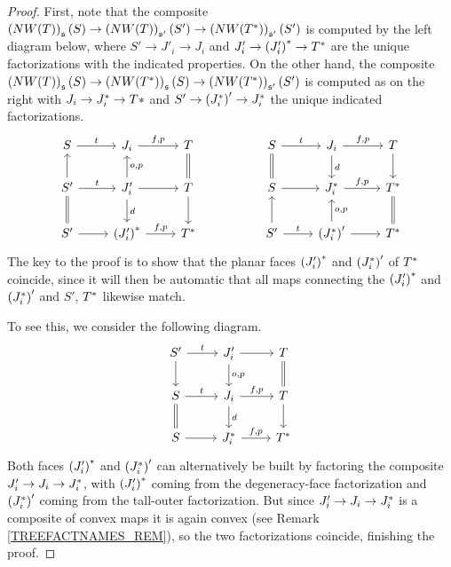 \documentclass[a4paper,10pt
,draft
]{article}%
\numberwithin{equation}{section}
\numberwithin{figure}{section}
\theoremstyle{definition} %
\newcommand{\1}{\ensuremath{\mathbbm 1}}%
\begin{document}
\begin{proof}
	First, note that the composite
	$\left(NW(T)\right)_{\mathfrak{s}}({S})
	\to 
	\left(NW(T)\right)_{\mathfrak{s}'}({S'})
	\to 
	\left(NW(T^{\**})\right)_{\mathfrak{s}'}({S'})$
	is computed by the left diagram below,
	where
	$S' \to J'_i \to J_i$
	and 
	$J'_i \to \left(J_i'\right)^{\**} \to T^{\**}$
	are the unique factorizations with the indicated properties.
	On the other hand, the composite
	$\left(NW(T)\right)_{\mathfrak{s}}(S)
	\to 
	\left(NW(T^{\**})\right)_{\mathfrak{s}}(S)
	\to 
	\left(NW(T^{\**})\right)_{\mathfrak{s}'}(S')$
	is computed as on the right
	with 
	$J_i \to J^{\**}_i \to T*$ and
	$S' \to \left(J_i^{\**}\right)' \to J^{\**}_i$
	the unique indicated factorizations.
\begin{equation}
\begin{tikzcd}
	S \ar{r}{t} 
&
	J_i \ar{r}{f,p} 
&
	T \ar[equal]{d}
&&%
	S \ar{r}{t} \ar[equal]{d}
&
	J_i \ar{r}{f,p} \ar{d}{d}
&
	T \ar{d}
\\
	S' \ar{u} \ar{r}{t} \ar[equal]{d}
&
	J'_i \ar{r} \arrow{u}[swap]{o,p} \arrow{d}{d}
&
	T \ar{d}
&&%
	S \ar{r}
&
	J^{\**}_i \arrow{r}{f,p}
&
	T^{\**} \ar[equal]{d}
\\
	S' \ar{r}
&
	\left(J_i'\right)^{\**} \arrow{r}{f,p}
&
	T^{\**}
&&%
	S' \arrow{r}{t} \ar{u}
&
	\left(J_i^{\**}\right)' \ar{r} \arrow{u}[swap]{o,p}
&
	T^{\**}
\end{tikzcd}
\end{equation}
	The key to the proof is to show
	that the planar faces 
	$\left(J_i'\right)^{\**}$ and
	$\left(J_i^{\**}\right)'$
	of $T^{\**}$
	coincide, since it will then be automatic that all maps connecting the
	$\left(J_i'\right)^{\**}$ and
	$\left(J_i^{\**}\right)'$
	and $S'$, $T^{\**}$
	likewise match.

	To see this, we consider the following diagram.
\begin{equation}
\begin{tikzcd}
	S' \ar{r}{t} \ar{d}
&
	J'_i \ar{r} \ar{d}{o,p}
&
	T \ar[equal]{d}
\\
	S  \ar{r}{t} \ar[equal]{d}
&
	J_i \ar{r}{f,p}  \ar{d}{d}
&
	T \ar{d}
\\
	S \ar{r}
&
	J_i^{\**} \ar{r}{f,p}
&
	T^{\**}
\end{tikzcd}
\end{equation}
	Both faces  
	$\left(J'_i\right)^{\**}$ and 
	$\left(J^{\**}_i\right)'
	$
	can alternatively be built by factoring
	the composite 
	$J'_i \to J_i \to J_i^{\**}$,
	with 
	$\left(J'_i\right)^{\**}$ 
	coming from the 
	degeneracy-face factorization
	and 
	$\left(J^{\**}_i\right)'$
	coming from the 
	tall-outer factorization.
	But since 
	$J'_i \to J_i \to J_i^{\**}$
	is a composite of convex maps 
        it is again convex (see Remark \ref{TREEFACTNAMES_REM}), 
	so the two factorizations coincide, 
	finishing the proof.
\end{proof}
\end{document}
